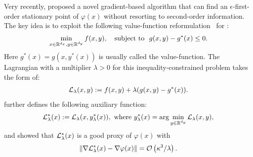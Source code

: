 \documentclass[twoside,11pt]{article}
\begin{document}
Very recently,  \citet{kwon2023fully}  proposed a novel gradient-based algorithm that can find an $\epsilon$-first-order stationary point of $\varphi(x)$ without resorting to second-order information.  
The key idea is to exploit the following value-function reformulation~\citep{outrata1990numerical,ye1995optimality,ye2010new,dempe2002foundations,lin2014solving} for :
\begin{align} \label{value-refo}
    \min_{x \in {\mathbb{R}}^{d_x}, y \in {\mathbb{R}}^{d_y}} f(x,y) , \quad {\rm subject ~to}~~ g(x,y) - g^*(x) \le 0.
\end{align}
Here $g^*(x) = g(x,y^*(x))$ is usually called the value-function. The 
Lagrangian with a multiplier $\lambda >0$ for this inequality-constrained problem takes the form of:
\begin{align} \label{eq:L}
    {\mathcal{L}}_{\lambda}(x,y):= f(x,y)+ \lambda ( g(x,y) - g^*(x)).
\end{align}
\citet{kwon2023fully} further defines the following auxiliary function:
\begin{align}\label{eq:L-lambda}
\begin{split}
     {\mathcal{L}}_{\lambda}^*(x) := {\mathcal{L}}_{\lambda}(x,y_{\lambda}^*(x)),~
     {\rm where }~ y_{\lambda}^*(x) = \arg \min_{y \in {\mathbb{R}}^{d_y}} {\mathcal{L}}_{\lambda}(x,y),
\end{split}
\end{align}
and showed that ${\mathcal{L}}_{\lambda}^*(x)$ is a good proxy of $\varphi(x)$ with
\begin{align*}
    \Vert \nabla {\mathcal{L}}_{\lambda}^*(x) - \nabla \varphi(x)  \Vert = {\mathcal{O}} \left( \kappa^3 /\lambda \right).
\end{align*}
\end{document}
